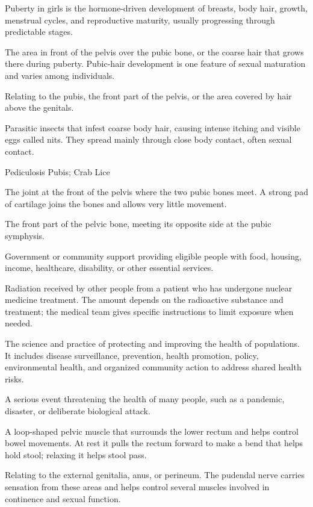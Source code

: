  Puberty in girls is the hormone-driven development of breasts, body hair, growth, menstrual cycles, and reproductive maturity, usually progressing through predictable stages.

 The area in front of the pelvis over the pubic bone, or the coarse hair that grows there during puberty. Pubic-hair development is one feature of sexual maturation and varies among individuals.

 Relating to the pubis, the front part of the pelvis, or the area covered by hair above the genitals.

 Parasitic insects that infest coarse body hair, causing intense itching and visible eggs called nits. They spread mainly through close body contact, often sexual contact.

\synonyms
Pediculosis Pubis; Crab Lice

 The joint at the front of the pelvis where the two pubic bones meet. A strong pad of cartilage joins the bones and allows very little movement.

 The front part of the pelvic bone, meeting its opposite side at the pubic symphysis.

 Government or community support providing eligible people with food, housing, income, healthcare, disability, or other essential services.

 Radiation received by other people from a patient who has undergone nuclear medicine treatment. The amount depends on the radioactive substance and treatment; the medical team gives specific instructions to limit exposure when needed.

 The science and practice of protecting and improving the health of populations. It includes disease surveillance, prevention, health promotion, policy, environmental health, and organized community action to address shared health risks.

 A serious event threatening the health of many people, such as a pandemic, disaster, or deliberate biological attack.

 A loop-shaped pelvic muscle that surrounds the lower rectum and helps control bowel movements. At rest it pulls the rectum forward to make a bend that helps hold stool; relaxing it helps stool pass.

 Relating to the external genitalia, anus, or perineum. The pudendal nerve carries sensation from these areas and helps control several muscles involved in continence and sexual function.

